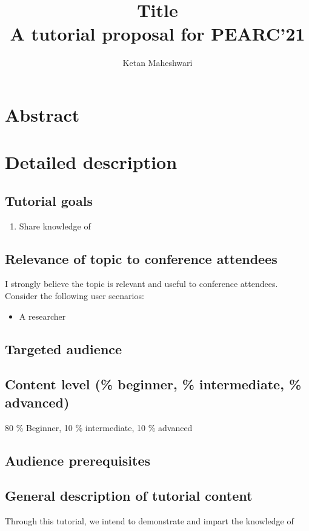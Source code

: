 \documentclass{report}
\title{ Title\\
       \large A tutorial proposal for PEARC'21
			 }
\author{Ketan Maheshwari}
\begin{document}
\maketitle
\section*{Abstract}

\section*{Detailed description}
\subsection*{Tutorial goals}
\begin{enumerate}
\item Share knowledge of 
\end{enumerate}

\subsection*{Relevance of topic to conference attendees}
I strongly believe the topic is relevant and useful to conference attendees. Consider the following user scenarios:
\begin{itemize}
\item A researcher 
\end{itemize}

\subsection*{Targeted audience}
\subsection*{Content level (\% beginner, \% intermediate, \% advanced)}
80 \% Beginner, 10 \% intermediate, 10 \% advanced
\subsection*{Audience prerequisites}

\subsection*{General description of tutorial content}
Through this tutorial, we  intend to demonstrate and impart the knowledge of
\end{document}
